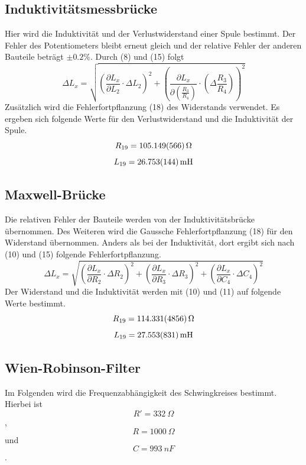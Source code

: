 \subsection{Induktivitätsmessbrücke}
Hier wird die Induktivität und der Verlustwiderstand einer Spule bestimmt.
Der Fehler des Potentiometers bleibt erneut gleich und der relative Fehler der anderen Bauteile beträgt $\pm 0.2 \%$.
Durch (8) und (15) folgt
\begin{equation}
    \Delta L_x = \sqrt{\left (\frac{\partial L_x}{\partial L_2}\cdot \Delta L_2 \right )^2 + \left (\frac{\partial L_x}{\partial \left (\frac{R_3}{R_4}\right )} \cdot \left (\Delta \frac{R_3}{R_4}\right )\right )^2}
\end{equation}
Zusätzlich wird die Fehlerfortpflanzung (18) des Widerstands verwendet.
Es ergeben sich folgende Werte für den Verlustwiderstand und die Induktivität der Spule.
\begin{equation}
    R_\text{19} = \SI{105,149 \pm 0,566}{\Omega} \notag
\end{equation}
\begin{equation}
    L_\text{19} = \SI{26,753 \pm 0,144}{mH} \notag
\end{equation}

\subsection{Maxwell-Brücke}
Die relativen Fehler der Bauteile werden von der Induktivitätsbrücke übernommen.
Des Weiteren wird die Gaussche Fehlerfortpflanzung (18) für den Widerstand übernommen.
Anders als bei der Induktivität, dort ergibt sich nach (10) und (15) folgende Fehlerfortpflanzung.
\begin{equation}
    \Delta L_x = \sqrt{\left (\frac{\partial L_x}{\partial R_2}\cdot \Delta R_2 \right )^2 + \left (\frac{\partial L_x}{\partial R_3} \cdot \Delta R_3\right )^2 + \left (\frac{\partial L_x}{\partial C_4} \cdot \Delta C_4\right )^2 }
\end{equation}
Der Widerstand und die Induktivität werden mit (10) und (11) auf folgende Werte bestimmt.
\begin{equation}
    R_\text{19} = \SI{114,331 \pm 4,856}{\Omega} \notag
\end{equation}
\begin{equation}
    L_\text{19} = \SI{27,553 \pm 0,831}{mH} \notag
\end{equation}

\subsection{Wien-Robinson-Filter}
Im Folgenden wird die Frequenzabhängigkeit des Schwingkreises bestimmt.
Hierbei ist 
\begin{equation*}
    R' = \SI{332}{\Omega}
\end{equation*},
\begin{equation*}
    R = \SI{1000}{\Omega}
\end{equation*} und 
\begin{equation*}
    C = \SI{993}{nF}
\end{equation*}.

